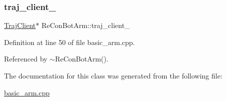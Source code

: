 \subsubsection{\texorpdfstring{traj\+\_\+client\+\_\+}{traj\_client\_}}
{\footnotesize\ttfamily \hyperlink{basic__arm_8cpp_a6fb8875093261cdc69e54d3ac7d5c301}{Traj\+Client}$\ast$ Re\+Con\+Bot\+Arm\+::traj\+\_\+client\+\_\+\hspace{0.3cm}{\ttfamily [private]}}



Definition at line 50 of file basic\+\_\+arm.\+cpp.



Referenced by $\sim$\+Re\+Con\+Bot\+Arm().



The documentation for this class was generated from the following file\+:\begin{DoxyCompactItemize}
\item 
\hyperlink{basic__arm_8cpp}{basic\+\_\+arm.\+cpp}\end{DoxyCompactItemize}
